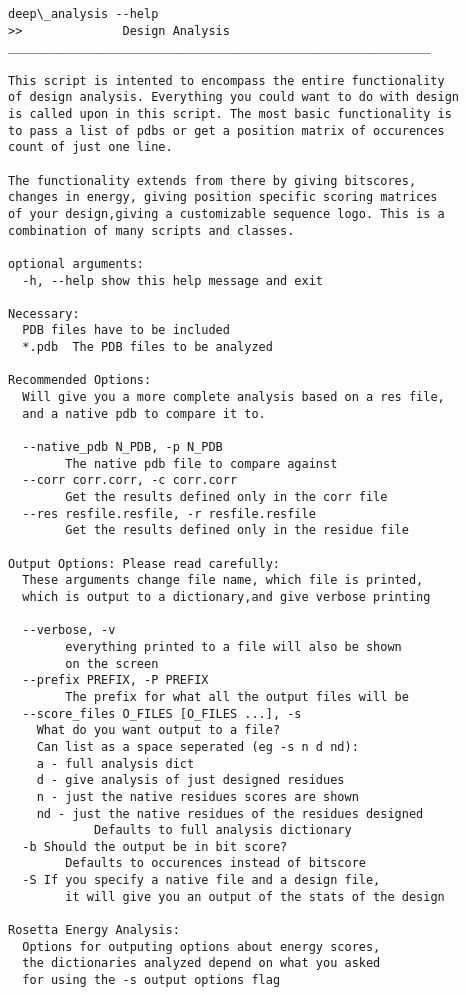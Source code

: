 \begin{lstlisting}[breaklines=true]
deep\_analysis --help
>>              Design Analysis
___________________________________________________________

This script is intented to encompass the entire functionality
of design analysis. Everything you could want to do with design
is called upon in this script. The most basic functionality is
to pass a list of pdbs or get a position matrix of occurences
count of just one line.

The functionality extends from there by giving bitscores,
changes in energy, giving position specific scoring matrices
of your design,giving a customizable sequence logo. This is a
combination of many scripts and classes.

optional arguments:
  -h, --help show this help message and exit

Necessary:
  PDB files have to be included
  *.pdb  The PDB files to be analyzed

Recommended Options:
  Will give you a more complete analysis based on a res file,
  and a native pdb to compare it to.

  --native_pdb N_PDB, -p N_PDB
        The native pdb file to compare against
  --corr corr.corr, -c corr.corr
        Get the results defined only in the corr file
  --res resfile.resfile, -r resfile.resfile
        Get the results defined only in the residue file

Output Options: Please read carefully:
  These arguments change file name, which file is printed,
  which is output to a dictionary,and give verbose printing

  --verbose, -v
        everything printed to a file will also be shown
        on the screen
  --prefix PREFIX, -P PREFIX
        The prefix for what all the output files will be
  --score_files O_FILES [O_FILES ...], -s
    What do you want output to a file?
    Can list as a space seperated (eg -s n d nd):
    a - full analysis dict
    d - give analysis of just designed residues
    n - just the native residues scores are shown
    nd - just the native residues of the residues designed
            Defaults to full analysis dictionary
  -b Should the output be in bit score?
        Defaults to occurences instead of bitscore
  -S If you specify a native file and a design file,
        it will give you an output of the stats of the design

Rosetta Energy Analysis:
  Options for outputing options about energy scores,
  the dictionaries analyzed depend on what you asked
  for using the -s output options flag


\end{lstlisting}
